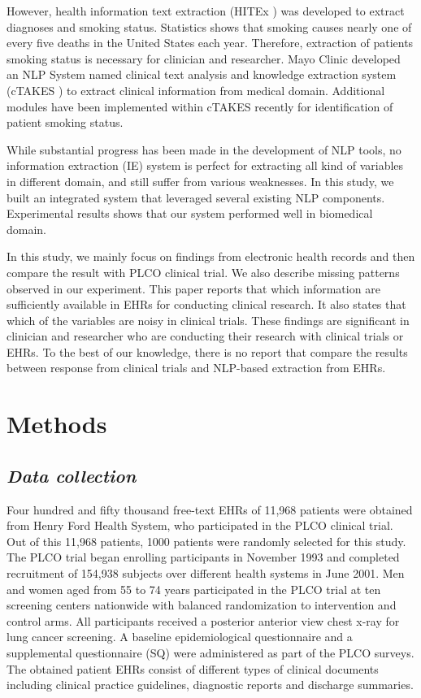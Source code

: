 \documentclass{amia}
\begin{document}
However, health information text extraction (HITEx \cite{zeng2006extracting}) was developed to extract diagnoses and smoking status. Statistics shows that smoking causes nearly one of every five deaths in the United States each year. Therefore, extraction of patients smoking status is necessary for clinician and researcher. Mayo Clinic developed an NLP System named clinical text analysis and knowledge extraction system (cTAKES \cite{savova2010mayo}) to extract clinical information from medical domain. Additional modules have been implemented within cTAKES recently \cite{savova2008mayo} for identification of patient smoking status.   
 
While substantial progress has been made in the development of NLP tools, no information extraction (IE) system is perfect for extracting all kind of variables in different domain, and still suffer from various weaknesses. In this study, we built an integrated system that leveraged several existing NLP components. Experimental results shows that our system performed well in biomedical domain. 

In this study, we mainly focus on findings from electronic health records and then compare the result with PLCO clinical trial. We also describe missing patterns observed in our experiment. This paper reports that which information are sufficiently available in EHRs for conducting clinical research. It also states that which of the variables are noisy in clinical trials. These findings are significant in clinician and researcher who are conducting their research with clinical trials or EHRs. To the best of our knowledge, there is no report that compare the results between response from clinical trials and NLP-based extraction from EHRs. 

\section*{Methods}
\subsection*{\textit{Data collection}}
Four hundred and fifty thousand free-text EHRs of 11,968 patients were obtained from Henry Ford Health System, who participated in the PLCO clinical trial. Out of this 11,968 patients, 1000 patients were randomly selected for this study. The PLCO trial began enrolling participants in November 1993 and completed recruitment of 154,938 subjects over different health systems in June 2001. Men and women aged from 55 to 74 years participated in the PLCO trial at ten screening centers nationwide with balanced randomization to intervention and control arms. All participants received a posterior anterior view chest x-ray for lung cancer screening. A baseline epidemiological questionnaire and a supplemental questionnaire (SQ) were administered as part of the PLCO surveys. The obtained patient EHRs consist of different types of clinical documents including clinical practice guidelines, diagnostic reports and discharge summaries.
\end{document}
